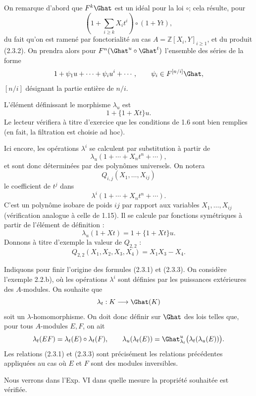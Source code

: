 \documentclass[11pt]{article}
\begin{document}
On remarque d'abord que \(F^k\Ghat\) est un idéal pour la loi \(\circ\); cela résulte, pour
\[
  \left(1+\sum_{i\geq k}X_i t^i\right)\circ(1+Yt),
\]
du fait qu'on est ramené par fonctorialité au cas \(A=\mathbb Z[X_i,Y]_{i\geq1}\), et du produit (2.3.2). On prendra alors pour \(F^n(\Ghat^u\circ\Ghat^t)\) l'ensemble des séries de la forme
\[
  1+\psi_1u+\cdots+\psi_i u^i+\cdots,\qquad
  \psi_i\in F^{[n/i]}\Ghat,
\]
\([n/i]\) désignant la partie entière de \(n/i\).

L'élément définissant le morphisme \(\lambda_u\) est
\[
  1+\{1+Xt\}u.
\]
Le lecteur vérifiera à titre d'exercice que les conditions de 1.6 sont bien remplies (en fait, la filtration est choisie ad hoc).

Ici encore, les opérations \(\lambda^i\) se calculent par substitution à partir de
\[
  \lambda_u(1+\cdots+X_nt^n+\cdots),
\]
et sont donc déterminées par des polynômes universels. On notera
\[
  Q_{i,j}(X_1,\ldots,X_{ij})
\]
le coefficient de \(t^j\) dans
\[
  \lambda^i(1+\cdots+X_nt^n+\cdots).
\]
C'est un polynôme isobare de poids \(ij\) par rapport aux variables \(X_1,\ldots,X_{ij}\) (vérification analogue à celle de 1.15). Il se calcule par fonctions symétriques à partir de l'élément de définition :
\begin{equation}\tag{2.3.3}
  \lambda_u(1+Xt)=1+\{1+Xt\}u.
\end{equation}
Donnons à titre d'exemple la valeur de \(Q_{2,2}\) :
\[
  Q_{2,2}(X_1,X_2,X_3,X_4)=X_1X_3-X_4.
\]

Indiquons pour finir l'origine des formules (2.3.1) et (2.3.3). On considère l'exemple 2.2.b), où les opérations \(\lambda^i\) sont définies par les puissances extérieures des \(A\)-modules. On souhaite que
\[
  \lambda_t:K\longrightarrow\Ghat(K)
\]
soit un \(\lambda\)-homomorphisme. On doit donc définir sur \(\Ghat\) des lois telles que, pour tous \(A\)-modules \(E,F\), on ait
\[
  \lambda_t(EF)=\lambda_t(E)\circ\lambda_t(F),\qquad
  \lambda_u(\lambda_t(E))=\Ghat^u_{\lambda_t}\bigl(\lambda_t(\lambda_u(E))\bigr).
\]
Les relations (2.3.1) et (2.3.3) sont précisément les relations précédentes appliquées au cas où \(E\) et \(F\) sont des modules inversibles.

Nous verrons dans l'Exp. VI dans quelle mesure la propriété souhaitée est vérifiée.
\end{document}
